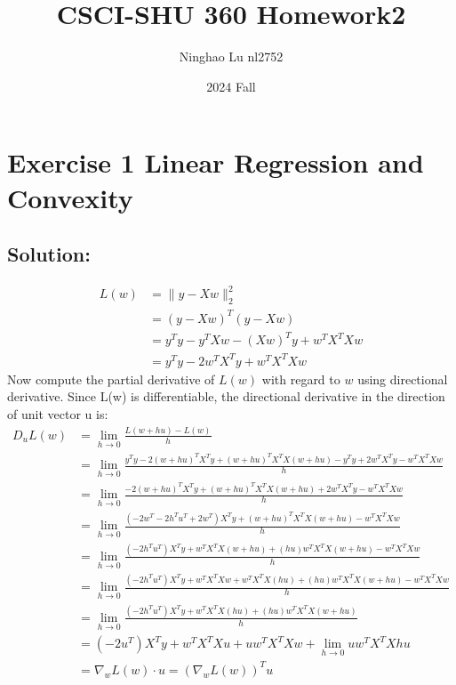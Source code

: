 \documentclass{article}
\title{CSCI-SHU 360 Homework2}
\author{Ninghao Lu nl2752}
\date{2024 Fall}
\begin{document}
\maketitle

\section*{Exercise 1 Linear Regression and Convexity}
\subsection*{Solution:}
\begin{align*}
    L(w) &=  \lVert y - X w\rVert^2_2 \\
         &= (y - X w)^T(y - X w) \\
         &= y^T y - y^T X w - (X w)^T y + w^T X^T X w \\
         &= y^T y - 2 w^T X^T y + w^T X^T X w
\end{align*}
Now compute the partial derivative of $L(w)$ with regard to $w$ using directional derivative.
Since L(w) is differentiable, the directional derivative in the direction of unit vector u is:
\begin{align*}
    D_u L(w) &= \lim_{h \to 0} \frac{L(w + hu) - L(w)}{h} \\
                  &= \lim_{h \to 0} \frac{y^T y - 2 (w+hu)^T X^T y + (w+hu)^T X^T X (w+hu) - y^T y + 2 w^T X^T y - w^T X^T X w}{h} \\
                  &= \lim_{h \to 0} \frac{- 2 (w+hu)^T X^T y + (w+hu)^T X^T X (w+hu) + 2 w^T X^T y - w^T X^T X w}{h} \\
                  &= \lim_{h \to 0} \frac{(- 2w^T - 2h^Tu^T + 2w^T) X^T y + (w+hu)^T X^T X (w+hu) - w^T X^T X w}{h} \\
                  &= \lim_{h \to 0} \frac{(- 2h^Tu^T) X^T y + w^T X^T X (w+hu) + (hu) w^T X^T X (w+hu) - w^T X^T X w}{h} \\
                  &= \lim_{h \to 0} \frac{(- 2h^Tu^T) X^T y + w^T X^T X w + w^T X^T X (hu) + (hu) w^T X^T X (w+hu) - w^T X^T X w}{h} \\
                  &= \lim_{h \to 0} \frac{(- 2h^Tu^T) X^T y + w^T X^T X (hu) + (hu) w^T X^T X (w+hu)}{h} \\
                  &= (- 2 u^T) X^T y + w^T X^T X u + u w^T X^T X w + \lim_{h \to 0} u w^T X^T X hu \\ 
                  &= \nabla_w L(w) \cdot u = (\nabla_w L(w))^T u
\end{align*}
\end{document}
